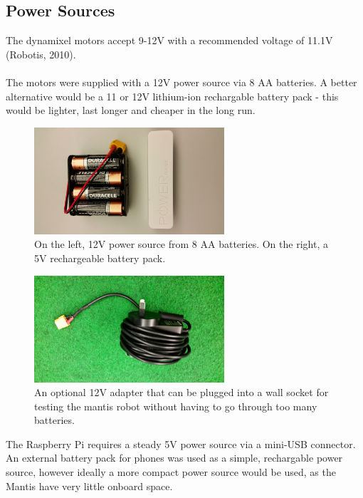 \documentclass[]{article}
\begin{document}
\subsection{Power Sources}
The dynamixel motors accept 9-12V with a recommended voltage of 11.1V (Robotis, 2010).
\\
\\
The motors were supplied with a 12V power source via 8 AA batteries. A better alternative would be a 11 or 12V lithium-ion rechargable battery pack - this would be lighter, last longer and cheaper in the long run.
\begin{figure}[H]
\centering
\includegraphics[width=200pt]{report_images/power_sources.jpg}
\caption{On the left, 12V power source from 8 AA batteries. On the right, a 5V rechargeable battery pack.}
\end{figure}
\begin{figure}[H]
\centering
\includegraphics[width=200pt]{report_images/wall_power.jpg}
\caption{An optional 12V adapter that can be plugged into a wall socket for testing the mantis robot without having to go through too many batteries.}
\end{figure}
The Raspberry Pi requires a steady 5V power source via a mini-USB connector. An external battery pack for phones was used as a simple, rechargable power source, however ideally a more compact power source would be used, as the Mantis have very little onboard space.
\end{document}
